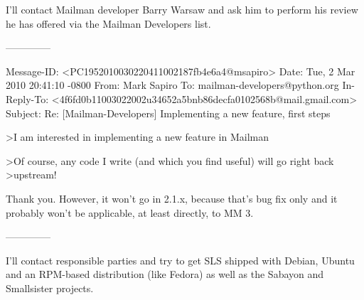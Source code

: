 \documentclass[a4]{article}
\begin{document}
I'll contact Mailman developer Barry Warsaw and ask him to perform his review
he has offered via the Mailman Developers list.

--------------

Message-ID: <PC1952010030220411002187fb4e6a4@msapiro>
Date: Tue, 2 Mar 2010 20:41:10 -0800
From: Mark Sapiro
To: mailman-developers@python.org
In-Reply-To: <4f6fd0b11003022002u34652a5bnb86decfa0102568b@mail.gmail.com>
Subject: Re: [Mailman-Developers] Implementing a new feature, first steps

>I am interested in implementing a new feature in Mailman

>Of course, any code I write (and which you find useful) will go right back
>upstream!

Thank you. However, it won't go in 2.1.x, because that's bug fix only
and it probably won't be applicable, at least directly, to MM 3.

--------------

I'll contact responsible parties and try to get SLS shipped with Debian, Ubuntu
and an RPM-based distribution (like Fedora) as well as the Sabayon and
Smallsister projects.
\end{document}

